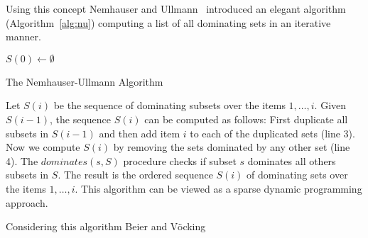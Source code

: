 \documentclass{article}
\begin{document}
Using this concept Nemhauser and Ullmann~\cite{nemhauser1969discrete} introduced an elegant
algorithm (Algorithm~\ref{alg:nu}) computing a list of all dominating sets in an iterative manner.

\begin{algorithm}[H]
 $S(0) \leftarrow \emptyset $\;
 \caption{The Nemhauser-Ullmann Algorithm}
 \label{alg:nu}
\end{algorithm}

Let $S(i)$ be the sequence of dominating subsets over the items $1, \ldots, i$.
Given $S(i-1)$, the sequence $S(i)$ can be computed as follows:
First duplicate all subsets in $S(i-1)$ and then add item $i$ to each of the duplicated sets (line 3).
Now we compute $S(i)$ by removing the sets dominated by any other set (line 4).
The $dominates(s, S)$ procedure checks if subset $s$ dominates all others subsets in $S$.
The result is the ordered sequence $S(i)$ of dominating sets over the items $1, \ldots, i$.
This algorithm can be viewed as a sparse dynamic programming approach.

Considering this algorithm Beier and V{\"o}cking~\cite{beier2003random}



\end{document}

